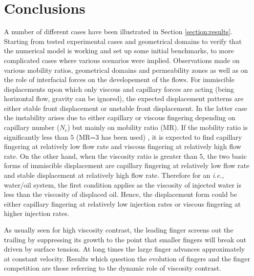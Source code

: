 \documentclass[preprint,authoryear,12pt]{elsarticle}
\newcommand{\ie}{{\it i.e., }}
\begin{document}
\section{Conclusions}\label{Section:Conclusion}

\medskip
A number of different cases have been illustrated in Section \ref{section:results}. Starting from tested experimental cases and geometrical domains to verify that the numerical model is working and set up some initial benchmarks, to more complicated cases where various scenarios were implied. Observations made on various mobility ratios, geometrical domains and permeability zones as well as on the role of interfacial forces on the developement of the flows. For immiscible displacements upon which only viscous and capillary forces are acting (being horizontal flow, gravity can be ignored), the expected displacement patterns are either stable front displacement or unstable front displacement. In the latter case the instability arises due to either capillary or viscous fingering depending on capillary number ($N_{c}$) but mainly on mobility ratio (MR). If the mobility ratio is significantly less than $5$ (MR=$3$ has been used) , it is expected to find capillary fingering at relatively low flow rate and viscous fingering at relatively high flow rate. On the other hand, when the viscosity ratio is greater than $5$, the two basic forms of immiscible displacement are capillary fingering at relatively low flow rate and stable displacement at relatively high flow rate. Therefore for an \ie water/oil system, the first condition applies as the viscosity of injected water is less than the viscosity of displaced oil. Hence, the displacement form could be either capillary fingering at relatively low injection rates or viscous fingering at higher injection rates. 


\medskip
As usually seen for high viscosity contrast, the leading finger screens out the trailing by suppressing its growth to the point that smaller fingers will break out driven by surface tension. At long times the large finger advances approximately at
constant velocity. Results which question the evolution of fingers and the finger competition are those referring to the dynamic role of viscosity contrast.
\end{document}
